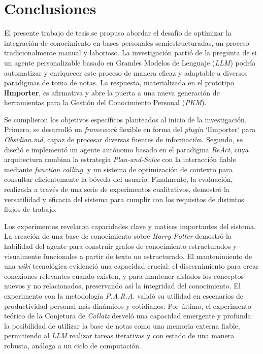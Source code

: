 \chapter*{Conclusiones}

El presente trabajo de tesis se propuso abordar el desafío de optimizar la integración de conocimiento en bases personales semiestructuradas, un proceso tradicionalmente manual y laborioso. La investigación partió de la pregunta de si un agente personalizable basado en Grandes Modelos de Lenguaje (\textit{LLM}) podría automatizar y enriquecer este proceso de manera eficaz y adaptable a diversos paradigmas de toma de notas. La respuesta, materializada en el prototipo \textbf{lImporter}, es afirmativa y abre la puerta a una nueva generación de herramientas para la Gestión del Conocimiento Personal (\textit{PKM}).

Se cumplieron los objetivos específicos planteados al inicio de la investigación. Primero, se desarrolló un \textit{framework} flexible en forma del \textit{plugin} `lImporter` para \textit{Obsidian.md}, capaz de procesar diversas fuentes de información. Segundo, se diseñó e implementó un agente autónomo basado en el paradigma \textit{ReAct}, cuya arquitectura combina la estrategia \textit{Plan-and-Solve} con la interacción fiable mediante \textit{function calling}, y un sistema de optimización de contexto para consultar eficientemente la bóveda del usuario. Finalmente, la evaluación, realizada a través de una serie de experimentos cualitativos, demostró la versatilidad y eficacia del sistema para cumplir con los requisitos de distintos flujos de trabajo.

Los experimentos revelaron capacidades clave y matices importantes del sistema. La creación de una base de conocimiento sobre \textit{Harry Potter} demostró la habilidad del agente para construir grafos de conocimiento estructurados y visualmente funcionales a partir de texto no estructurado. El mantenimiento de una \textit{wiki} tecnológica evidenció una capacidad crucial: el discernimiento para crear conexiones relevantes cuando existen, y para mantener aislados los conceptos nuevos y no relacionados, preservando así la integridad del conocimiento. El experimento con la metodología \textit{P.A.R.A}. validó su utilidad en escenarios de productividad personal más dinámicos y cotidianos. Por último, el experimento teórico de la Conjetura de \textit{Collatz} desveló una capacidad emergente y profunda: la posibilidad de utilizar la base de notas como una memoria externa fiable, permitiendo al \textit{LLM} realizar tareas iterativas y con estado de una manera robusta, análoga a un ciclo de computación.

